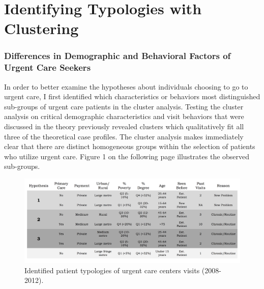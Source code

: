 \documentclass[12pt,twoside]{reedthesis}
\begin{document}
  \section*{Identifying Typologies with
  Clustering}\label{identifying-typologies-with-clustering}
  
  \subsubsection*{Differences in Demographic and Behavioral Factors of
  Urgent Care
  Seekers}\label{differences-in-demographic-and-behavioral-factors-of-urgent-care-seekers}
  
  In order to better examine the hypotheses about individuals choosing to
  go to urgent care, I first identified which characteristics or behaviors
  most distinguished sub-groups of urgent care patients in the cluster
  analysis. Testing the cluster analysis on critical demographic
  characteristics and visit behaviors that were discussed in the theory
  previously revealed clusters which qualitatively fit all three of the
  theoretical case profiles. The cluster analysis makes immediately clear
  that there are distinct homogeneous groups within the selection of
  patients who utilize urgent care. Figure 1 on the following page
  illustrates the observed sub-groups.
  
  \newpage
  
  \begin{figure}[h!]
  \centering
  \includegraphics[scale = 0.45,angle = 90]{figures/clusters.png}
  \caption[Identified patient typologies of urgent care centers visits (2008-2012).]{\normalsize{Identified patient typologies of urgent care centers visits (2008-2012).}}
  \label{fig:clus1}
  \end{figure}
  
\end{document}
